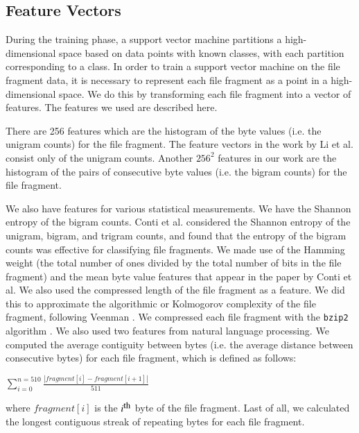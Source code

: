 \documentclass[5p]{elsarticle}
\begin{document}
\subsection{Feature Vectors}
\label{Subsection:FeatureVectors}
During the training phase, a support vector machine partitions a high-dimensional space based on data points with known classes, with each partition corresponding to a class. In order to train a support vector machine on the file fragment data, it is necessary to represent each file fragment as a point in a high-dimensional space. We do this by transforming each file fragment into a vector of features. The features we used are described here.

There are 256 features which are the histogram of the byte values (i.e. the unigram counts) for the file fragment. The feature vectors in the work by Li et al. \cite{Li10} consist only of the unigram counts. Another $256^2$ features in our work are the histogram of the pairs of consecutive byte values (i.e. the bigram counts) for the file fragment.

We also have features for various statistical measurements. We have the Shannon entropy \cite{Shannon48} of the bigram counts. Conti et al. \cite{Conti10} considered the Shannon entropy of the unigram, bigram, and trigram counts, and found that the entropy of the bigram counts was effective for classifying file fragments. We made use of the Hamming weight (the total number of ones divided by the total number of bits in the file fragment) and the mean byte value features that appear in the paper by Conti et al. We also used the compressed length of the file fragment as a feature. We did this to approximate the algorithmic or Kolmogorov complexity of the file fragment, following Veenman \cite{Veenman07}. We compressed each file fragment with the \texttt{bzip2} algorithm \cite{Seward01}. We also used two features from natural language processing. We computed the average contiguity between bytes (i.e. the average distance between consecutive bytes) for each file fragment, which is defined as follows:

\begin{center}
 $\sum_{i=0}^{n=510}\frac{|fragment[i] - fragment[i+1]|}{511}$
\end{center}

{\noindent}where $fragment[i]$ is the $i^\textrm{\small th}$ byte of the file fragment. Last of all, we calculated the longest contiguous streak of repeating bytes for each file fragment.
\end{document}
